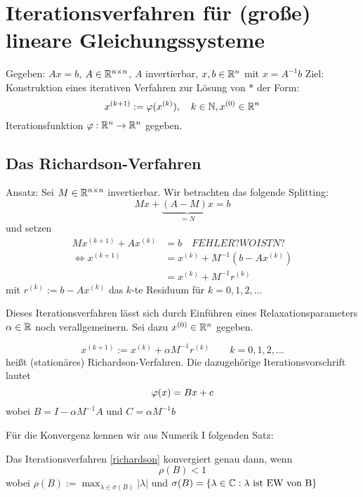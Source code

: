 \chapter[Iterationsverfahren für lineare Gleichungssysteme]{Iterationsverfahren für (große) lineare Gleichungssysteme}
Gegeben: $Ax=b$, $A\in \mathbb{R}^{n\times n}$, $A$ invertierbar, $x,b \in \mathbb{R}^n$ mit $x=A^{-1}b$
Ziel: Konstruktion eines iterativen Verfahren zur Lösung von * der Form:
\begin{equation}
  x^{(k+1)} := \varphi(x^{(k)}),\quad k\in \mathbb{N}, x^{(0)} \in \mathbb{R}^n
  \label{}
\end{equation}
Iterationsfunktion $\varphi: \mathbb{R}^n \to \mathbb{R}^n$ gegeben.

\section{Das Richardson-Verfahren}
Ansatz: Sei $M\in \mathbb{R}^{n\times n}$ invertierbar. Wir betrachten das folgende Splitting:
\begin{equation}
  Mx + \underbrace{(A-M)x}_{=N}= b
  \label{}
\end{equation}
und setzen 
\begin{equation}
  \begin{split}
    Mx^{(k+1)} + Ax^{(k)}     &= b \quad FEHLER? WO IST N?\\
    \Leftrightarrow x^{(k+1)} &= x^{(k)} + M^{-1}(b-Ax^{(k)})\\
    &= x^{(k)} + M^{-1}r^{(k)}
  \end{split}
  \label{}
\end{equation}
mit $ r^{(k)} := b-Ax^{(k)}$ das $k$-te Residuum für $k=0,1,2,\dots$

 Dieses Iterationsverfahren lässt sich durch Einführen eines Relaxationsparameters $\alpha \in \mathbb{R}$ noch verallgemeinern. Sei dazu $x^{(0)}\in \mathbb{R}^n$ gegeben. 

\begin{definition}
   \label{richardson}
   \[
     x^{(k+1)} := x^{(k)} + \alpha M^{-1} r^{(k)} \qquad k=0,1,2,\dots
   \]
   heißt (stationäres) Richardson-Verfahren. Die dazugehörige Iterationsvorschrift lautet
   \[
     \varphi(x) = Bx + c\\
   \]
   wobei $B=I-\alpha M^{-1}A$ und $C=\alpha M^{-1}b$
\end{definition}


Für die Konvergenz kennen wir aus Numerik I folgenden Satz:

\begin{satz}
  \label{itkonvergenz}
  Das Iterationsverfahren \eqref{richardson} konvergiert genau dann, wenn 
  \begin{equation}
    \rho (B) < 1 
    \label{}
  \end{equation}
  wobei $\rho(B) := \max_{\lambda \in \sigma(B)} |\lambda|$ und $\sigma(B) = \left\{ \lambda\in \mathbb{C}: \lambda \text{ ist EW von B} \right\}$
\end{satz}

